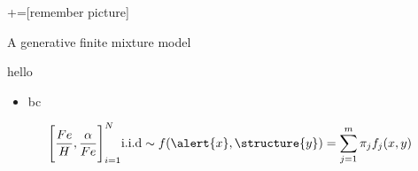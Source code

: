\documentclass{beamer}
\newcommand{\eqn}[1]{\begin{align*}
#1
\end{align*}}
\newcommand{\clr}[2]{{\color{#1}{#2}}}
\newcommand{\afe}{\frac{\alpha}{Fe}}
\newcommand{\feh}{\frac{Fe}{H}}
\begin{document}
+=[remember picture]

\everymath{\displaystyle}







\begin{frame}[shrink]{A generative finite mixture model}
	
	\alert{hello}
	
	
	
	\begin{itemize}
		\item \clr{red}{a}bc
	\end{itemize}
	
	\eqn{
		\Bigg[\feh,\afe\Bigg]_{i=1}^{N} \text{i.i.d} \sim f(\alert{x},\structure{y}) = \sum^m_{j=1} \pi_j f_j(x,y)
	}
	
\end{frame}
\end{document}
